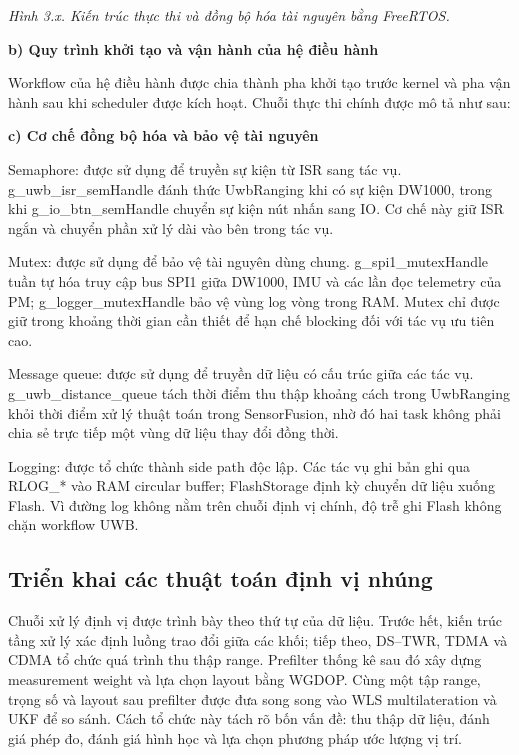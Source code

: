 \documentclass[
  a4paper,
]{report}
\begin{document}
\emph{Hình 3.x. Kiến trúc thực thi và đồng bộ hóa tài nguyên bằng
FreeRTOS.}

\textbf{b) Quy trình khởi tạo và vận hành của hệ điều hành}

Workflow của hệ điều hành được chia thành pha khởi tạo trước kernel và
pha vận hành sau khi scheduler được kích hoạt. Chuỗi thực thi chính được
mô tả như sau:

\textbf{c) Cơ chế đồng bộ hóa và bảo vệ tài nguyên}

Semaphore: được sử dụng để truyền sự kiện từ ISR sang tác vụ.
g\_uwb\_isr\_semHandle đánh thức UwbRanging khi có sự kiện DW1000, trong
khi g\_io\_btn\_semHandle chuyển sự kiện nút nhấn sang IO. Cơ chế này
giữ ISR ngắn và chuyển phần xử lý dài vào bên trong tác vụ.

Mutex: được sử dụng để bảo vệ tài nguyên dùng chung.
g\_spi1\_mutexHandle tuần tự hóa truy cập bus SPI1 giữa DW1000, IMU và
các lần đọc telemetry của PM; g\_logger\_mutexHandle bảo vệ vùng log
vòng trong RAM. Mutex chỉ được giữ trong khoảng thời gian cần thiết để
hạn chế blocking đối với tác vụ ưu tiên cao.

Message queue: được sử dụng để truyền dữ liệu có cấu trúc giữa các tác
vụ. g\_uwb\_distance\_queue tách thời điểm thu thập khoảng cách trong
UwbRanging khỏi thời điểm xử lý thuật toán trong SensorFusion, nhờ đó
hai task không phải chia sẻ trực tiếp một vùng dữ liệu thay đổi đồng
thời.

Logging: được tổ chức thành side path độc lập. Các tác vụ ghi bản ghi
qua RLOG\_* vào RAM circular buffer; FlashStorage định kỳ chuyển dữ liệu
xuống Flash. Vì đường log không nằm trên chuỗi định vị chính, độ trễ ghi
Flash không chặn workflow UWB.

\subsection{Triển khai các thuật toán định vị nhúng}

Chuỗi xử lý định vị được trình bày theo thứ tự của dữ liệu. Trước hết, kiến
trúc tầng xử lý xác định luồng trao đổi giữa các khối; tiếp theo, DS--TWR,
TDMA và CDMA tổ chức quá trình thu thập range. Prefilter thống kê sau đó xây
dựng measurement weight và lựa chọn layout bằng WGDOP. Cùng một tập range,
trọng số và layout sau prefilter được đưa song song vào WLS multilateration và
UKF để so sánh. Cách tổ chức này tách rõ bốn vấn đề: thu thập dữ liệu, đánh
giá phép đo, đánh giá hình học và lựa chọn phương pháp ước lượng vị trí.
\end{document}
